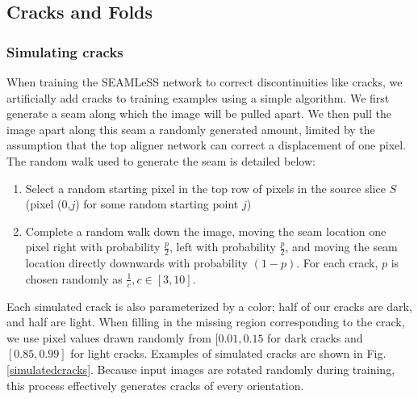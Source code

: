 \documentclass{article}
\begin{document}
\subsection{Cracks and Folds}

\subsubsection{Simulating cracks}

When training the SEAMLeSS network to correct discontinuities like cracks, we artificially add cracks to training examples using a simple algorithm. We first generate a seam along which the image will be pulled apart. We then pull the image apart along this seam a randomly generated amount, limited by the assumption that the top aligner network can correct a displacement of one pixel. The random walk used to generate the seam is detailed below:
\begin{enumerate}
    \item Select a random starting pixel in the top row of pixels in the source slice $S$ (pixel (0,$j$) for some random starting point $j$)
    \item Complete a random walk down the image, moving the seam location one pixel right with probability $\frac{p}{2}$, left with probability $\frac{p}{2}$, and moving the seam location directly downwards with probability $(1-p)$. For each crack, $p$ is chosen randomly as $\frac{1}{c}, c\in [3,10]$.
\end{enumerate}

Each simulated crack is also parameterized by a color; half of our cracks are dark, and half are light. When filling in the missing region corresponding to the crack, we use pixel values drawn randomly from $[0.01,0.15$ for dark cracks and $[0.85,0.99]$ for light cracks. Examples of simulated cracks are shown in Fig.\ref{simulatedcracks}. Because input images are rotated randomly during training, this process effectively generates cracks of every orientation.
\end{document}
